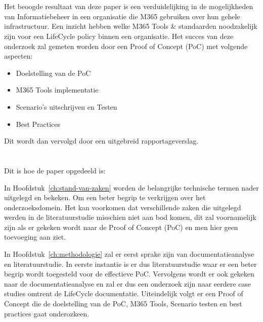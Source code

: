 \section{}%
\label{sec:onderzoeksdoelstelling}

Het beoogde resultaat van deze paper is een verduidelijking in de mogelijkheden van Informatiebeheer in een organisatie die M365 gebruiken over hun gehele infrastructuur.
Een inzicht hebben welke M365 Tools \& standaarden noodzakelijk zijn voor een LifeCycle policy binnen een organisatie.
Het succes van deze onderzoek zal gemeten worden door een Proof of Concept (PoC) met volgende aspecten:
\begin{itemize}
  \item Doelstelling van de PoC
  \item M365 Tools implementatie
  \item Scenario's uitschrijven en Testen
  \item Best Practices
\end{itemize}

Dit wordt dan vervolgd door een uitgebreid rapportageverslag.

\section{}%
\label{sec:opzet-bachelorproef}


Dit is hoe de paper opgedeeld is:

In Hoofdstuk~\ref{ch:stand-van-zaken} worden de belangrijke technische termen nader uitgelegd en bekeken. Om een beter begrip te verkrijgen over het onderzoeksdomein.
Het kan voorkomen dat verschillende zaken die uitgelegd werden in de literatuurstudie misschien niet aan bod komen, dit zal voornamelijk zijn als er gekeken wordt naar de Proof of Concept (PoC) en men hier geen toevoeging aan ziet.

In Hoofdstuk~\ref{ch:methodologie} zal er eerst sprake zijn van documentatieanalyse en literatuurstudie. In eerste instantie is er dus literatuurstudie waar er een beter begrip wordt toegesteld voor de effectieve PoC.
Vervolgens wordt er ook gekeken naar de documentatieanalyse en zal er dus een onderzoek zijn naar eerdere case studies omtrent de LifeCycle documentatie.
Uiteindelijk volgt er een Proof of Concept die de doelstelling van de PoC, M365 Tools, Scenario testen en best practices gaat onderozkeen.

